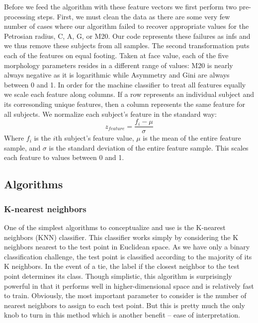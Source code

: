 \documentclass[twocolumn]{aastex6}
\begin{document}
Before we feed the algorithm with these feature vectors we first perform two pre-processing steps. First, we must clean the data as there are some very few number of cases where our algorithm failed to recover appropriate values for the Petrosian radius, C, A, G, or M20. Our code represents these failures as infs and we thus remove these subjects from all samples.  The second transformation puts each of the features on equal footing. Taken at face value, each of the five morphology parameters resides in a different range of values:  M20 is nearly always negative as it is logarithmic while Asymmetry and Gini are always between 0 and 1.  In order for the machine classifier to treat all features equally we scale each feature along columns. If a row represents an individual subject and its corresonding unique features, then a column represents the same feature for all subjects. We normalize each subject's feature in the standard way: 
\begin{equation}
z_{feature} = \frac{f_i - \mu}{\sigma}
\end{equation} 
Where $f_i$ is the $i$th subject's feature value, $\mu$ is the mean of the entire feature sample, and $\sigma$ is the standard deviation of the entire feature sample. This scales each feature to values between 0 and 1. 


\subsection{Algorithms}



\subsubsection{K-nearest neighbors}
One of the simplest algorithms to conceptualize and use is the K-nearest neighbors (KNN) classifier. This classifier works simply by considering the K neighbors nearest to the test point in Euclidean space. As we have only a binary classification challenge, the test point is classified according to the majority of its K neighbors. In the event of a tie, the label if the closest neighbor to the test point determines its class. Though simplistic, this algorithm is surprisingly powerful in that it performs well in higher-dimensional space and is relatively fast to train. Obviously, the most important parameter to consider is the number of nearest neighbors to assign to each test point. But this is pretty much the only knob to turn in this method which is another benefit -- ease of interpretation. 
\end{document}
